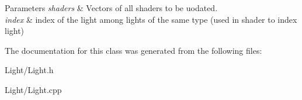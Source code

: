 \begin{DoxyParams}{Parameters}
{\em shaders} & Vectors of all shaders to be uodated. \\
\hline
{\em index} & index of the light among lights of the same type (used in shader to index light) \\
\hline
\end{DoxyParams}


The documentation for this class was generated from the following files\+:\begin{DoxyCompactItemize}
\item 
Light/Light.\+h\item 
Light/Light.\+cpp\end{DoxyCompactItemize}

